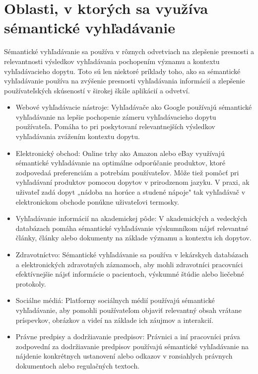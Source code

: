 \documentclass[10pt,twoside,slovak,a4paper]{article}
\begin{document}
\section{Oblasti, v ktorých sa využíva sémantické vyhľadávanie} \label{oblasti} %
Sémantické vyhľadávanie sa používa v rôznych odvetviach na zlepšenie presnosti a relevantnosti výsledkov vyhľadávania pochopením významu a kontextu vyhľadávacieho dopytu.
Toto sú len niektoré príklady toho, ako sa sémantické vyhľadávanie používa na zvýšenie presnosti vyhľadávania informácií a zlepšenie používateľských skúseností v širokej škále aplikácií a odvetví.
\begin{itemize}
\item \cite{tumer2009empirical} Webové vyhľadávacie nástroje: Vyhľadávače ako Google používajú sémantické vyhľadávanie na lepšie pochopenie zámeru vyhľadávacieho dopytu používateľa. Pomáha to pri poskytovaní relevantnejších výsledkov vyhľadávania zvážením kontextu dopytu.
\item Elektronický obchod: Online trhy ako Amazon alebo eBay využívajú sémantické vyhľadávanie na optimálne odporúčanie produktov, ktoré zodpovedaá preferenciám a potrebám používateľov. Môže tiež pomôcť pri vyhľadávaní produktov pomocou dopytov v prirodzenom jazyku. V praxi, ak uživateľ zadá dopyt „nádoba na horúce a studené nápoje" tak vyhľadávač v elektronickom obchode ponúkne uživateľovi termosky.
\item Vyhľadávanie informácií na akademickej pôde: V akademických a vedeckých databázach pomáha sémantické vyhľadávanie výskumníkom nájsť relevantné články, články alebo dokumenty na základe významu a kontextu ich dopytov.
\item Zdravotníctvo: Sémantické vyhľadávanie sa používa v lekárskych databázach a elektronických zdravotných záznamoch, aby mohli zdravotníci pracovníci efektívnejšie nájsť informácie o pacientoch, výskumné štúdie alebo liečebné protokoly.
\item \cite{cotfas2019semantic} Sociálne médiá: Platformy sociálnych médií používajú sémantické vyhľadávanie, aby pomohli používateľom objaviť relevantný obsah vrátane príspevkov, obrázkov a videí na základe ich záujmov a interakcií.
\item \cite{nazarenko2018annotation} Právne predpisy a dodržiavanie predpisov: Právnici a iní pracovníci práva zodpovední za dodržiavanie predpisov používajú sémantické vyhľadávanie na nájdenie konkrétnych ustanovení alebo odkazov v rozsiahlych právnych dokumentoch alebo regulačných textoch.
\end{itemize}
\end{document}
